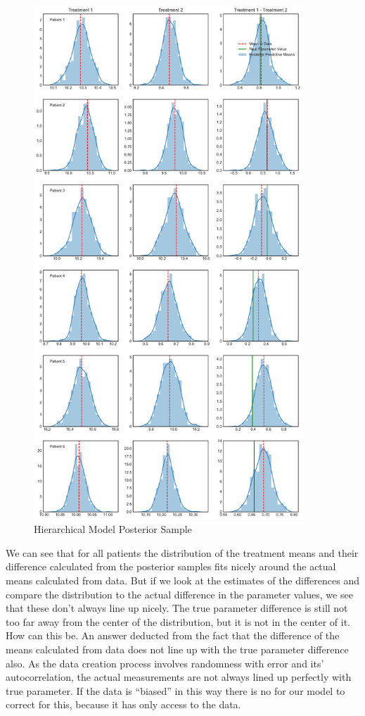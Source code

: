 \documentclass[12pt,a4paper,leqno]{report}
\theoremstyle{plain}
\theoremstyle{definition}
\theoremstyle{remark}
\begin{document}
\begin{figure}[H]
    \caption{Hierarchical Model Posterior Sample}\label{hierarchicalmodelposteriorsampling}
    \bigskip
    \centering
    \includegraphics[width=\textwidth,height=7.6in,keepaspectratio]{hierarchical_model_posterior_sampling.pdf}
\end{figure}

We can see that for all patients the distribution of the treatment means and their
difference calculated from the posterior samples fits nicely around the actual means
calculated from data. But if we look at the estimates of the differences and compare the
distribution to the actual difference in the parameter values, we see that these don't
always line up nicely. The true parameter difference is still not too far away from the
center of the distribution, but it is not in the center of it. How can this be. An
answer deducted from the fact that the difference of the means calculated
from data does not line up with the true parameter difference also. As the data creation
process involves randomness with error and its' autocorrelation, the actual measurements
are not always lined up perfectly with true parameter. If the data is ``biased'' in this
way there is no for our model to correct for this, because it has only access to the data.
\end{document}
